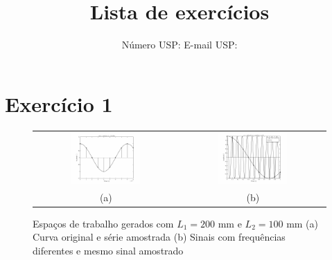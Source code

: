 \documentclass[twoside, fleqn]{article}
\title{Lista de exercícios \esnumber}
\author{\studentname \qquad Número USP: \uspid \qquad E-mail USP: \uspmail}
\begin{document}
\maketitle


\listoffigures
\lstlistoflistings

\newpage

\section*{Exercício 1}
    
    \begin{figure}[H]
        \centering
        \begin{tabular}{cc}
        \includegraphics[width=0.5\textwidth]{images/ex1a.eps} & \includegraphics[width=0.5\textwidth]{images/ex1c.eps} \\ (a) & (b)
        \end{tabular}
        \caption{\label{fig:ex1ac} Espaços de trabalho gerados com $L_1 = 200$ mm e $L_2 = 100$ mm (a) Curva original e série amostrada (b) Sinais com frequências diferentes e mesmo sinal amostrado} 
    \end{figure}
    
\end{document}
